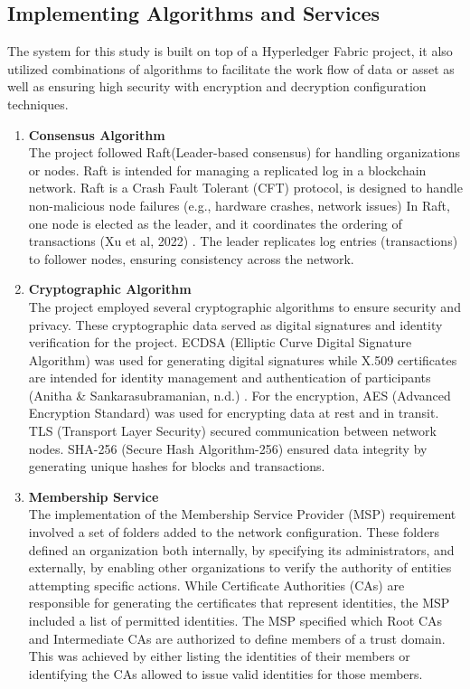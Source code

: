 \subsection{Implementing Algorithms and Services}
The system for this study is built on top of a Hyperledger Fabric project, it also utilized combinations of algorithms to facilitate the work flow of data or asset as well as ensuring high security with encryption and decryption configuration techniques. 
	\begin{enumerate}
		\item \textbf{Consensus Algorithm} \\The project followed Raft(Leader-based consensus) for handling organizations or nodes. Raft is intended for managing a replicated log in a blockchain network. Raft is a Crash Fault Tolerant (CFT) protocol, is designed to handle non-malicious node failures (e.g., hardware crashes, network issues) In Raft, one node is elected as the leader, and it coordinates the ordering of transactions (Xu et al, 2022) \nocite{method-1}. The leader replicates log entries (transactions) to follower nodes, ensuring consistency across the network. 
		
		\item \textbf{Cryptographic Algorithm} \\The project employed several cryptographic algorithms to ensure security and privacy. These cryptographic data served as digital signatures and identity verification for the project. ECDSA (Elliptic Curve Digital Signature Algorithm) was used for generating digital signatures while X.509 certificates are intended for identity management and authentication of participants (Anitha \& Sankarasubramanian, n.d.) \nocite{method-2}. For the encryption, AES (Advanced Encryption Standard) was used for encrypting data at rest and in transit. TLS (Transport Layer Security) secured communication between network nodes. SHA-256 (Secure Hash Algorithm-256) ensured data integrity by generating unique hashes for blocks and transactions.
		
		\item \textbf{Membership Service} \\The implementation of the Membership Service Provider (MSP) requirement involved a set of folders added to the network configuration. These folders defined an organization both internally, by specifying its administrators, and externally, by enabling other organizations to verify the authority of entities attempting specific actions. While Certificate Authorities (CAs) are responsible for generating the certificates that represent identities, the MSP included a list of permitted identities. The MSP specified which Root CAs and Intermediate CAs are authorized to define members of a trust domain. This was achieved by either listing the identities of their members or identifying the CAs allowed to issue valid identities for those members.
		

\end{enumerate}
